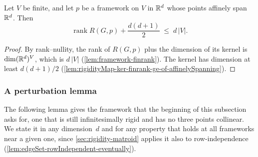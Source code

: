 \begin{lemma}
  \label{lem:rigidityMap-finrank-range-le-of-affinelySpanning}
  \leanok
  Let $V$ be finite, and let $p$ be a framework on $V$ in ${\mathbb{R}}^{d}$
  whose points affinely span ${\mathbb{R}}^{d}$. Then
  \[
    \operatorname{rank} R(G, p) + \frac{d(d+1)}{2} \;\le\; d\,|V|.
  \]
\end{lemma}
\begin{proof}
  \leanok
  By rank--nullity, the rank of $R(G, p)$ plus the dimension of its
  kernel is $\dim ({\mathbb{R}}^{d})^{V}$, which is $d\,|V|$
  (\cref{lem:framework-finrank}). The kernel has dimension at least
  $d(d+1)/2$ (\cref{lem:rigidityMap-ker-finrank-ge-of-affinelySpanning}).
\end{proof}

\subsubsection{A perturbation lemma}

The following lemma gives the framework that the beginning of this
subsection asks for, one that is still infinitesimally rigid and has no
three points collinear. We state it in any dimension~$d$ and for any
property that holds at all frameworks near a given one, since
\cref{sec:rigidity-matroid} applies it also to row-independence
(\cref{lem:edgeSet-rowIndependent-eventually}).

